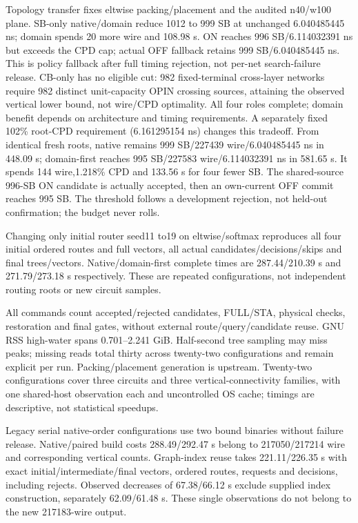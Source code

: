\documentclass[conference,10pt]{IEEEtran}
\begin{document}
Topology transfer fixes eltwise packing/placement and the audited n40/w100 plane. SB-only native/domain reduce 1012 to 999 SB at unchanged 6.040485445 ns; domain spends 20 more wire and 108.98 s. ON reaches 996 SB/6.114032391 ns but exceeds the CPD cap; actual OFF fallback retains 999 SB/6.040485445 ns. This is policy fallback after full timing rejection, not per-net search-failure release. CB-only has no eligible cut: 982 fixed-terminal cross-layer networks require 982 distinct unit-capacity OPIN crossing sources, attaining the observed vertical lower bound, not wire/CPD optimality. All four roles complete; domain benefit depends on architecture and timing requirements. A separately fixed 102\% root-CPD requirement (6.161295154 ns) changes this tradeoff. From identical fresh roots, native remains 999 SB/227439 wire/6.040485445 ns in 448.09 s; domain-first reaches 995 SB/227583 wire/6.114032391 ns in 581.65 s. It spends 144 wire,1.218\% CPD and 133.56 s for four fewer SB. The shared-source 996-SB ON candidate is actually accepted, then an own-current OFF commit reaches 995 SB. The threshold follows a development rejection, not held-out confirmation; the budget never rolls.

Changing only initial router seed11 to19 on eltwise/softmax reproduces all four initial ordered routes and full vectors, all actual candidates/decisions/skips and final trees/vectors. Native/domain-first complete times are 287.44/210.39 s and 271.79/273.18 s respectively. These are repeated configurations, not independent routing roots or new circuit samples.

All commands count accepted/rejected candidates, FULL/STA, physical checks, restoration and final gates, without external route/query/candidate reuse. GNU RSS high-water spans 0.701--2.241 GiB. Half-second tree sampling may miss peaks; missing reads total thirty across twenty-two configurations and remain explicit per run. Packing/placement generation is upstream. Twenty-two configurations cover three circuits and three vertical-connectivity families, with one shared-host observation each and uncontrolled OS cache; timings are descriptive, not statistical speedups.

Legacy serial native-order configurations use two bound binaries without failure release. Native/paired build costs 288.49/292.47 s belong to 217050/217214 wire and corresponding vertical counts. Graph-index reuse takes 221.11/226.35 s with exact initial/intermediate/final vectors, ordered routes, requests and decisions, including rejects. Observed decreases of 67.38/66.12 s exclude supplied index construction, separately 62.09/61.48 s. These single observations do not belong to the new 217183-wire output.
\end{document}
